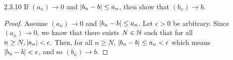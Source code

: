 \documentclass[12pt,letterpaper]{article}
\begin{document}
\begin{itemize}[leftmargin=!,labelindent=5pt]
\begin{proof}
            Next we prove that if $(x_n)$ and $(y_n)$ are both convergent with $\lim x_n = \lim y_n$ then $(z_n)$ is convergent.
            Assume $(x_n)$ and $(y_n)$ are both convergent with $\lim x_n = \lim y_n = l$.
            Let $\epsilon > 0$ be arbitrary.
            Then, we know that there exists an $N_1 \in \bbN$ such that for all $n \geq N_1$, $\abs{x_n - l} < \epsilon$.
            Similarly, we know that there exists an $N_2 \in \bbN$ such that for all $n \geq N_2$, $\abs{y_n - l} < \epsilon$.
            Let $N = $ max $\{2N_1, 2N_2\}$.
            Then, for all $n \geq N$, we have that $\abs{z_n - l} < \epsilon$ since $(z_n)$ consists of alternating elements from $(x_n)$ and $(y_n)$ which means after $N$ both $\abs{x_n - l} < \epsilon$ and $\abs{y_n - l} < \epsilon$.
            Thus, $(z_n)$ is convergent.
        \end{proof}
    \newpage
    \item [2.3.10] If $(a_n) \to 0$ and $\abs{b_n - b} \leq a_n$, then show that $(b_n) \to b$.
        \begin{proof}
            Assume $(a_n) \to 0$ and $\abs{b_n - b} \leq a_n$. 
            Let $\epsilon > 0$ be arbitrary.
            Since $(a_n) \to 0$, we know that there exists $N \in \mathbb{N}$ such that for all $n \geq N, \abs{a_n} < \epsilon$.
            Then, for all $n \geq N$, $\abs{b_n - b} \leq a_n < \epsilon$ which means $\abs{b_n - b} < \epsilon$, and so $(b_n) \to b$.
        \end{proof}
\end{itemize}
\end{document}
